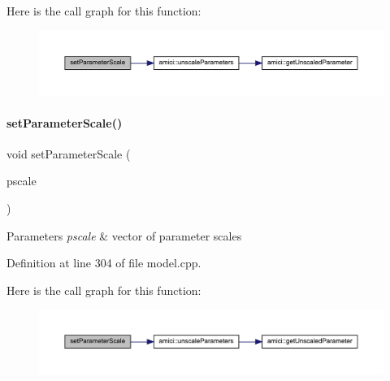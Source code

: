 Here is the call graph for this function\+:
\nopagebreak
\begin{figure}[H]
\begin{center}
\leavevmode
\includegraphics[width=350pt]{classamici_1_1_model_a7e25febbfd9db80f64a4f73a2718bda7_cgraph}
\end{center}
\end{figure}
\mbox{\label{classamici_1_1_model_a64aee7434ee9f99f004d8dc8eb776bc6}} 
\paragraph{\texorpdfstring{set\+Parameter\+Scale()}{setParameterScale()}\hspace{0.1cm}{\footnotesize\ttfamily [2/2]}}
{\footnotesize\ttfamily void set\+Parameter\+Scale (\begin{DoxyParamCaption}\item[{const std\+::vector$<$ \mbox{\hyperlink{namespaceamici_a42f062082226e9284c201d9eab71a3a0}{Parameter\+Scaling}} $>$ \&}]{pscale }\end{DoxyParamCaption})}


\begin{DoxyParams}{Parameters}
{\em pscale} & vector of parameter scales \\
\hline
\end{DoxyParams}


Definition at line 304 of file model.\+cpp.

Here is the call graph for this function\+:
\nopagebreak
\begin{figure}[H]
\begin{center}
\leavevmode
\includegraphics[width=350pt]{classamici_1_1_model_a64aee7434ee9f99f004d8dc8eb776bc6_cgraph}
\end{center}
\end{figure}
\mbox{\label{classamici_1_1_model_a1bb7ee08df1e2e42da7dceb2100b6131}} 
